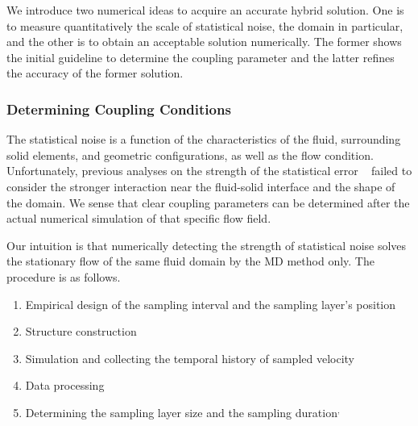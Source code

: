 \documentclass[preprint,12pt]{elsarticle}
\begin{document}
We introduce two numerical ideas to acquire an accurate hybrid solution. One is to measure quantitatively the scale of statistical noise, the domain in particular, and the other is to obtain an acceptable solution numerically. The former shows the initial guideline to determine the coupling parameter and the latter refines the accuracy of the former solution.


\subsubsection{Determining Coupling Conditions}
\label{sec:numerical_parameters}

The statistical noise is a function of the characteristics of the fluid, surrounding solid elements, and geometric configurations, as well as the flow condition. Unfortunately, previous analyses on the strength of the statistical error ~\cite{Hadjicon3,Time_Mechanism} failed to consider the stronger interaction near the fluid-solid interface and the shape of the domain. We sense that clear coupling parameters can be determined after the actual numerical simulation of that specific flow field.

Our intuition is that numerically detecting the strength of statistical noise solves the stationary flow of the same fluid domain by the MD method only. The procedure is as follows.

\begin{enumerate}
\item Empirical design of the sampling interval and the sampling layer's position\footnotemark
\item Structure construction\footnotemark
\item Simulation and collecting the temporal history of sampled velocity\footnotemark
\item Data processing\footnotemark
\item Determining the sampling layer size and the sampling duration\footnotemark$^{,}$\footnotemark
\end{enumerate}
\end{document}
